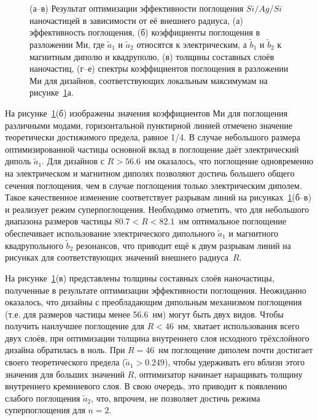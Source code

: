 \begin{figure}[t]
  \begin{minipage}[ht]{0.495\linewidth}
  \end{minipage}
  \hfill
  \begin{minipage}[ht]{0.495\linewidth}
  \end{minipage}
  \caption{ (а--в) Результат оптимизации эффективности поглощения
    $Si/Ag/Si$ наночастицей в зависимости от её внешнего радиуса, (а)
    эффективность поглощения, (б) коэффициенты поглощения в разложении
    Ми, где $\tilde{a}_1$ и $\tilde{a}_2$ относятся к электрическим, а
    $\tilde{b}_1$ и $\tilde{b}_2$ к магнитным диполю и квадруполю, (в)
    толщины составных слоёв наночастиц, (г--е) спектры коэффициентов
    поглощения в разложении Ми для дизайнов, соответствующих локальным
    максимумам на рисунке~\ref{img:q-abs}а.}
  \label{img:q-abs}  
\end{figure}


На рисунке~\ref{img:q-abs}(б) изображены значения коэффициентов Ми для
поглощения различными модами, горизонтальной пунктирной линией
отмечено значение теоретически достижимого предела, равное 1/4. В
случае небольшого размера оптимизированной частицы основной вклад в
поглощение даёт электрический диполь $\tilde{a}_1$.  Для дизайнов с
$R > 56.6$~нм оказалось, что поглощение одновременно на электрическом
и магнитном диполях позволяют достичь большего общего сечения
поглощения, чем в случае поглощения только электрическим
диполем. Такое качественное изменение соответствует разрывам линий на
рисунках~\ref{img:q-abs}(б--в) и реализует режим суперпоглощения.
Необходимо отметить, что для небольшого диапазона размеров частицы
$80.7<R<82.1$~нм оптимальное поглощение обеспечивает использование
электрического дипольного $\tilde{a}_1$ и магнитного квадрупольного
$\tilde{b}_2$ резонансов, что приводит ещё к двум разрывам линий на
рисунках для соответствующих значений внешнего радиуса~$R$.

На рисунке~\ref{img:q-abs}(в) представлены толщины составных слоёв
наночастицы, полученные в результате оптимизации эффективности
поглощения.  Неожиданно оказалось, что дизайны с преобладающим
дипольным механизмом поглощения (т.е. для размеров частицы менее
56.6~нм) могут быть двух видов.  Чтобы получить наилучшее поглощение
для $R<46$~нм, хватает использования всего двух слоёв, при оптимизации
толщина внутреннего слоя исходного трёхслойного дизайна обратилась в
ноль.  При $R=46$~нм поглощение диполем почти достигает своего
теоретического предела ($\tilde{a}_1>0.249$), чтобы удерживать его
вблизи этого значения для больших значений $R$, оптимизатор начинает
наращивать толщину внутреннего кремниевого слоя.  В свою очередь, это
приводит к появлению слабого поглощения  $\tilde{a}_2$,
что, впрочем, не позволяет достичь режима суперпоглощения для $n=2$.

